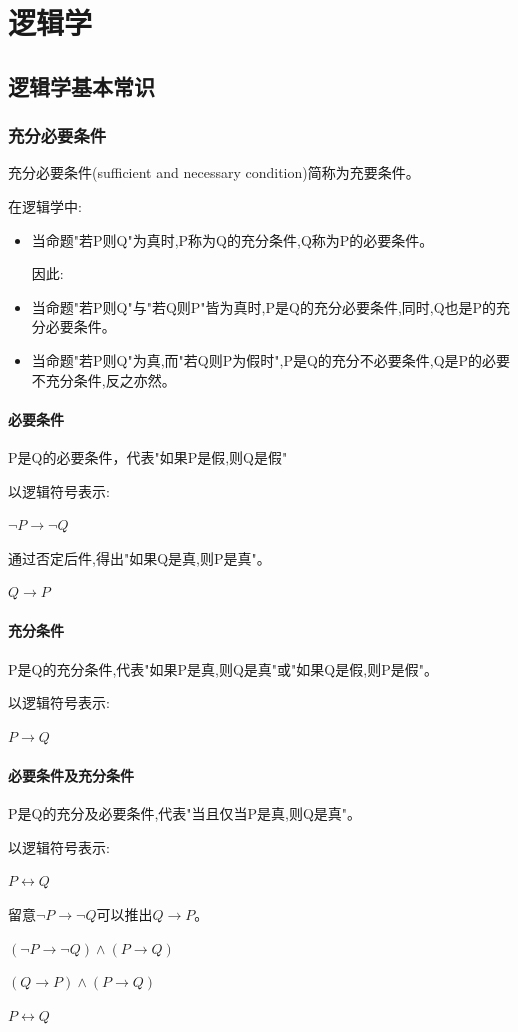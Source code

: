\documentclass[UTF8]{ctexbook}
\begin{document}
\chapter{逻辑学}{

  \section{逻辑学基本常识}{

    \subsection{充分必要条件}{

      充分必要条件(sufficient and necessary condition)简称为充要条件。

      在逻辑学中:
      \begin{itemize}
        \item 当命题"若P则Q"为真时,P称为Q的充分条件,Q称为P的必要条件。

              因此:

        \item 当命题"若P则Q"与"若Q则P"皆为真时,P是Q的充分必要条件,同时,Q也是P的充分必要条件。
        \item 当命题"若P则Q"为真,而"若Q则P为假时",P是Q的充分不必要条件,Q是P的必要不充分条件,反之亦然。
      \end{itemize}

      \subsubsection{必要条件}{
        P是Q的必要条件，代表"如果P是假,则Q是假"

        以逻辑符号表示:

        $\lnot P \to \lnot Q$

        通过否定后件,得出"如果Q是真,则P是真"。

        $Q \to P$
      }%

      \subsubsection{充分条件}{
        P是Q的充分条件,代表"如果P是真,则Q是真"或"如果Q是假,则P是假"。

        以逻辑符号表示:

        $P \to Q$
      }%

      \subsubsection{必要条件及充分条件}{
        P是Q的充分及必要条件,代表"当且仅当P是真,则Q是真"。

        以逻辑符号表示:

        $P \longleftrightarrow Q$

        留意$\lnot P \to \lnot Q$可以推出$Q \to P$。

        $(\lnot P \to \lnot Q) \land (P \to Q)$

        $(Q \to P) \land (P \to Q)$

        $P \longleftrightarrow Q$
      }%

    }%

   }%

 }%
\end{document}
